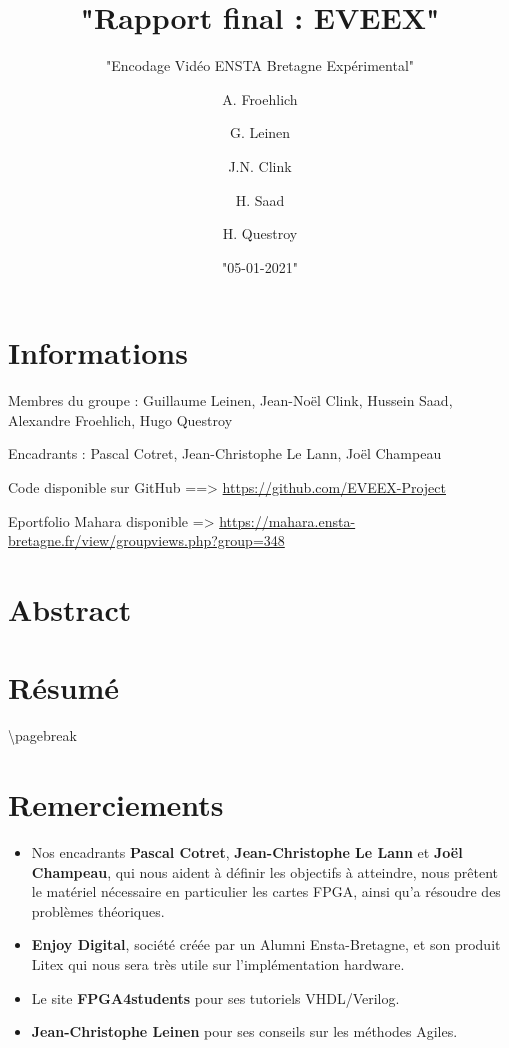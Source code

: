 \documentclass[
  french,
]{article}
\title{"Rapport final : EVEEX"}
\subtitle{"Encodage Vidéo ENSTA Bretagne Expérimental"}
\author{A. Froehlich \and G. Leinen \and J.N. Clink \and H. Saad \and H. Questroy}
\date{"05-01-2021"}
\begin{document}
\maketitle

\hypertarget{header-n2}{%
\section{Informations}\label{header-n2}}

Membres du groupe : Guillaume Leinen, Jean-Noël Clink, Hussein Saad,
Alexandre Froehlich, Hugo Questroy

Encadrants : Pascal Cotret, Jean-Christophe Le Lann, Joël Champeau

Code disponible sur GitHub ==\textgreater{}
\url{https://github.com/EVEEX-Project}

Eportfolio Mahara disponible =\textgreater{}
\url{https://mahara.ensta-bretagne.fr/view/groupviews.php?group=348}

\hypertarget{header-n7}{%
\section{Abstract}\label{header-n7}}

\hypertarget{header-n9}{%
\section{Résumé}\label{header-n9}}

\textbackslash pagebreak

\hypertarget{header-n11}{%
\section{Remerciements}\label{header-n11}}

\begin{itemize}
\item
  Nos encadrants \textbf{Pascal Cotret}, \textbf{Jean-Christophe Le
  Lann} et \textbf{Joël Champeau}, qui nous aident à définir les
  objectifs à atteindre, nous prêtent le matériel nécessaire en
  particulier les cartes FPGA, ainsi qu'a résoudre des problèmes
  théoriques.
\item
  \textbf{Enjoy Digital}, société créée par un Alumni Ensta-Bretagne, et
  son produit Litex qui nous sera très utile sur l'implémentation
  hardware.
\item
  Le site \textbf{FPGA4students} pour ses tutoriels VHDL/Verilog.
\item
  \textbf{Jean-Christophe Leinen} pour ses conseils sur les méthodes
  Agiles.
\end{itemize}
\end{document}
